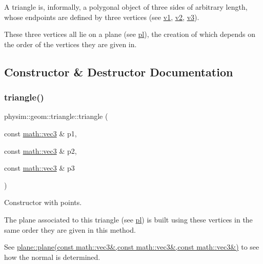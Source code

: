 A triangle is, informally, a polygonal object of three sides of arbitrary length, whose endpoints are defined by three vertices (see \hyperlink{classphysim_1_1geom_1_1triangle_ac339bfc839523549ecaf6b463c8eff32}{v1}, \hyperlink{classphysim_1_1geom_1_1triangle_a2d0fcc3373425eb17be35ad39e3e1bd1}{v2}, \hyperlink{classphysim_1_1geom_1_1triangle_a6014f960ce444144d8798a02db1f8a19}{v3}).

These three vertices all lie on a plane (see \hyperlink{classphysim_1_1geom_1_1triangle_a922a64002b6f20464754fdd1d1b7e382}{pl}), the creation of which depends on the order of the vertices they are given in. 

\subsection{Constructor \& Destructor Documentation}
\mbox{\label{classphysim_1_1geom_1_1triangle_a230bd56c1500301a2d07042d84614372}} 
\subsubsection{\texorpdfstring{triangle()}{triangle()}}
{\footnotesize\ttfamily physim\+::geom\+::triangle\+::triangle (\begin{DoxyParamCaption}\item[{const \hyperlink{structphysim_1_1math_1_1vec3}{math\+::vec3} \&}]{p1,  }\item[{const \hyperlink{structphysim_1_1math_1_1vec3}{math\+::vec3} \&}]{p2,  }\item[{const \hyperlink{structphysim_1_1math_1_1vec3}{math\+::vec3} \&}]{p3 }\end{DoxyParamCaption})}



Constructor with points. 

The plane associated to this triangle (see \hyperlink{classphysim_1_1geom_1_1triangle_a922a64002b6f20464754fdd1d1b7e382}{pl}) is built using these vertices in the same order they are given in this method.

See \hyperlink{classphysim_1_1geom_1_1plane_a2dd759ec4519cfd2fb943bda36988f9a}{plane\+::plane(const math\+::vec3\&,const math\+::vec3\&,const math\+::vec3\&)} to see how the normal is determined. 

